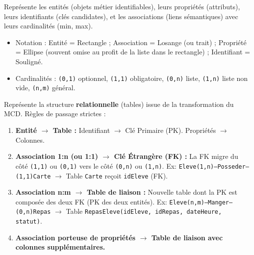 \documentclass[11pt]{article}
\newcommand{\cle}[1]{{\popxbold\color{popdark}#1}}
\begin{document}
\begin{definition}
Représente les \cle{entités} (objets métier identifiables), leurs \cle{propriétés} (attributs), leurs \cle{identifiants} (clés candidates), et les \cle{associations} (liens sémantiques) avec leurs \cle{cardinalités} (min, max).
\begin{itemize}
    \item Notation : Entité = Rectangle ; Association = Losange (ou trait) ; Propriété = Ellipse (souvent omise au profit de la liste dans le rectangle) ; Identifiant = Souligné.
    \item Cardinalités : \texttt{(0,1)} optionnel, \texttt{(1,1)} obligatoire, \texttt{(0,n)} liste, \texttt{(1,n)} liste non vide, \texttt{(n,m)} général.
\end{itemize}
\end{definition}

\begin{definition}
Représente la structure \textbf{relationnelle} (tables) issue de la transformation du MCD. Règles de passage strictes :
\begin{enumerate}
    \item \textbf{Entité $\rightarrow$ Table :} Identifiant $\rightarrow$ Clé Primaire (PK). Propriétés $\rightarrow$ Colonnes.
    \item \textbf{Association 1:n (ou 1:1) $\rightarrow$ Clé Étrangère (FK) :} La FK migre du côté \texttt{(1,1)} ou \texttt{(0,1)} vers le côté \texttt{(0,n)} ou \texttt{(1,n)}. Ex: \texttt{Eleve(1,n)--Posseder--(1,1)Carte} $\rightarrow$ Table \texttt{Carte} reçoit \texttt{idEleve} (FK).
    \item \textbf{Association n:m $\rightarrow$ Table de liaison :} Nouvelle table dont la PK est composée des deux FK (PK des deux entités). Ex: \texttt{Eleve(n,m)--Manger--(0,n)Repas} $\rightarrow$ Table \texttt{RepasEleve(idEleve, idRepas, dateHeure, statut)}.
    \item \textbf{Association porteuse de propriétés $\rightarrow$ Table de liaison avec colonnes supplémentaires.}
\end{enumerate}
\end{definition}
\end{document}
